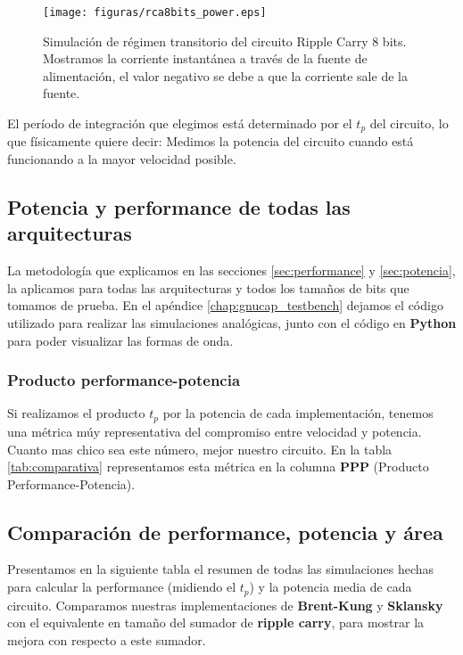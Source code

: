 \begin{figure}
  \centering
\texttt{[image: figuras/rca8bits\_power.eps]}
  \caption{Simulación de régimen transitorio del circuito Ripple Carry 8 bits. Mostramos la corriente instantánea a través de la fuente de alimentación, el valor negativo se debe a que la corriente sale de la fuente. }
\label{fig:sim_rca8_pow}
\end{figure}
El período de integración que elegimos está determinado por el $t_p$ del circuito, lo que físicamente quiere decir: Medimos la potencia del circuito cuando está funcionando a la mayor velocidad posible. 

\subsection{Potencia y performance de todas las arquitecturas}
La metodología que explicamos en las secciones \ref{sec:performance} y \ref{sec:potencia}, la aplicamos para todas las arquitecturas y todos los tamaños de bits que tomamos de prueba. En el apéndice \ref{chap:gnucap_testbench} dejamos el código utilizado para realizar las simulaciones analógicas, junto con el código en \textbf{Python} para poder visualizar las formas de onda.
\subsubsection{Producto performance-potencia}
Si realizamos el producto $t_p$ por la potencia de cada implementación, tenemos una métrica múy representativa del compromiso entre velocidad y potencia. Cuanto mas chico sea este número, mejor nuestro circuito. En la tabla \ref{tab:comparativa} representamos esta métrica en la columna \textbf{PPP} (Producto Performance-Potencia).

\subsection{Comparación de performance, potencia y área}\label{subsec:comparativa}
	
Presentamos en la siguiente tabla el resumen de todas las simulaciones hechas para calcular la performance (midiendo el $t_p$) y la potencia media de cada circuito. Comparamos nuestras implementaciones de \textbf{Brent-Kung} y \textbf{Sklansky} con el equivalente en tamaño del sumador de \textbf{ripple carry}, para mostrar la mejora con respecto a este sumador.


